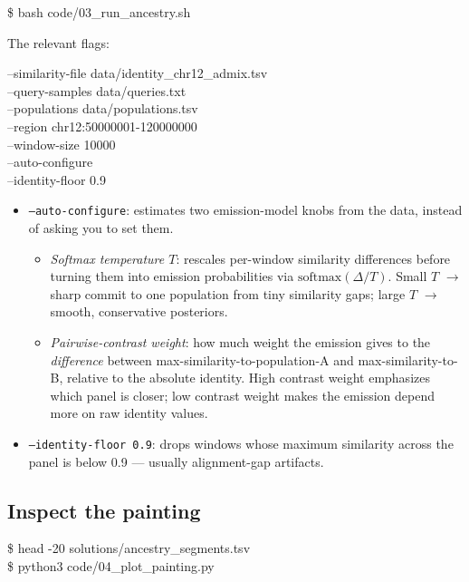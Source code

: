 \documentclass[11pt]{article}
\begin{document}
\begin{cmd}
\$ bash code/03\_run\_ancestry.sh
\end{cmd}

The relevant flags:

\begin{cmd}
--similarity-file data/identity\_chr12\_admix.tsv \\
--query-samples data/queries.txt \\
--populations data/populations.tsv \\
--region chr12:50000001-120000000 \\
--window-size 10000 \\
--auto-configure \\
--identity-floor 0.9
\end{cmd}

\begin{itemize}\setlength{\itemsep}{0.2em}
  \item \texttt{--auto-configure}: estimates two emission-model
    knobs from the data, instead of asking you to set them.
    \begin{itemize}\setlength{\itemsep}{0.1em}
      \item \emph{Softmax temperature $T$}: rescales per-window
        similarity differences before turning them into emission
        probabilities via $\text{softmax}(\Delta/T)$. Small $T$ $\to$
        sharp commit to one population from tiny similarity gaps;
        large $T$ $\to$ smooth, conservative posteriors.
      \item \emph{Pairwise-contrast weight}: how much weight the
        emission gives to the \emph{difference} between
        max-similarity-to-population-A and max-similarity-to-B,
        relative to the absolute identity. High contrast weight
        emphasizes which panel is closer; low contrast weight makes
        the emission depend more on raw identity values.
    \end{itemize}
  \item \texttt{--identity-floor 0.9}: drops windows whose maximum
    similarity across the panel is below 0.9 --- usually alignment-gap
    artifacts.
\end{itemize}

\subsection*{Inspect the painting}

\begin{cmd}
\$ head -20 solutions/ancestry\_segments.tsv \\
\$ python3 code/04\_plot\_painting.py
\end{cmd}
\end{document}
